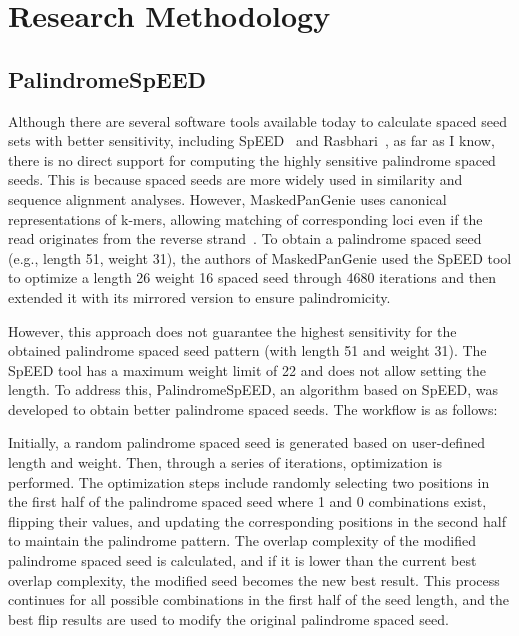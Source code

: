 \documentclass{PHlab-thesis}
\begin{document}
\chapter{Research Methodology}
\section{PalindromeSpEED}
Although there are several software tools available today to calculate spaced seed sets with better sensitivity, including SpEED~\cite{Lucian2011SpEED} and Rasbhari~\cite{Hahn2016Rasbhari}, as far as I know, there is no direct support for computing the highly sensitive palindrome spaced seeds. This is because spaced seeds are more widely used in similarity and sequence alignment analyses. However, MaskedPanGenie uses canonical representations of k-mers, allowing matching of corresponding loci even if the read originates from the reverse strand~\cite{haimo2023MaskedPanGenie}. To obtain a palindrome spaced seed (e.g., length 51, weight 31), the authors of MaskedPanGenie used the SpEED tool to optimize a length 26 weight 16 spaced seed through 4680 iterations and then extended it with its mirrored version to ensure palindromicity.

However, this approach does not guarantee the highest sensitivity for the obtained palindrome spaced seed pattern (with length 51 and weight 31). The SpEED tool has a maximum weight limit of 22 and does not allow setting the length. To address this, PalindromeSpEED, an algorithm based on SpEED, was developed to obtain better palindrome spaced seeds. The workflow is as follows:

Initially, a random palindrome spaced seed is generated based on user-defined length and weight. Then, through a series of iterations, optimization is performed. The optimization steps include randomly selecting two positions in the first half of the palindrome spaced seed where 1 and 0 combinations exist, flipping their values, and updating the corresponding positions in the second half to maintain the palindrome pattern. The overlap complexity of the modified palindrome spaced seed is calculated, and if it is lower than the current best overlap complexity, the modified seed becomes the new best result. This process continues for all possible combinations in the first half of the seed length, and the best flip results are used to modify the original palindrome spaced seed.
\end{document}
